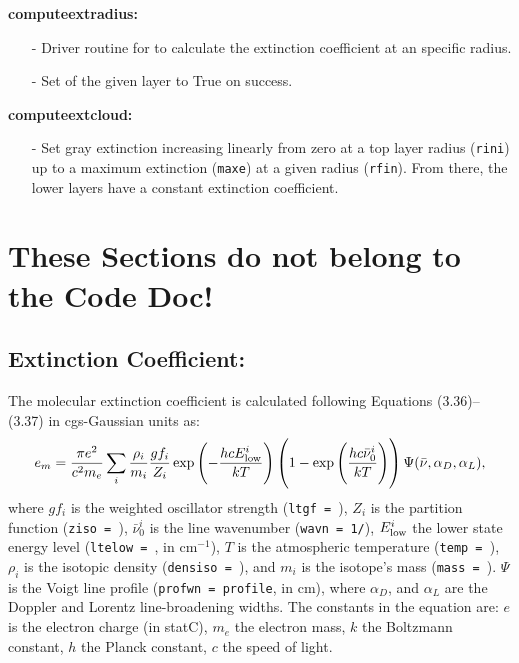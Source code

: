 \documentclass[letterpaper,12pt]{article}
\begin{document}
\textbf{computeextradius:}
\begin{itemize}[leftmargin=10pt, noitemsep, parsep=0pt, topsep=0ex]
\item[-] Driver routine for  to calculate the
  extinction coefficient at an specific radius.
\item[-] Set  of the given layer to True on
  success.
  \newline
\end{itemize}

\textbf{computeextcloud:}
\begin{itemize}[leftmargin=10pt, noitemsep, parsep=0pt, topsep=0ex]
\item[-] Set gray extinction increasing linearly from zero at a top
  layer radius (\texttt{rini}) up to a maximum extinction
  (\texttt{maxe}) at a given radius (\texttt{rfin}). From there, the
  lower layers have a constant extinction coefficient.  \newline
\end{itemize}


\newpage

\section{These Sections do not belong to the Code Doc!}

\subsection{Extinction Coefficient:}
The molecular extinction coefficient is calculated following Equations
(3.36)--(3.37) in cgs-Gaussian units as:
\begin{equation}
\label{eq:extinction}
  e_m = \frac{\pi e^2}{c^2 m_e} \sum_i \frac{\rho_i}{m_i} \frac{gf_i}{Z_i}
      \exp\left(-\frac{hcE_{\rm low}^i}{kT}\right)
      \left(1-\exp\left(\frac{hc\bar\nu_0^i}{kT}\right)\right)
      \Psi(\bar\nu, \alpha_D, \alpha_L),
\end{equation}
where $gf_i$ is the weighted oscillator strength (\texttt{ltgf =
}), $Z_i$ is the partition function
(\texttt{ziso = }), $\bar\nu_0^i$ is the line
wavenumber (\texttt{wavn = 1/}), $E_{\rm low}^i$
the lower state energy level (\texttt{ltelow =
}, in cm$^{-1}$), $T$ is the atmospheric
temperature (\texttt{temp = }), $\rho_i$ is the
isotopic density (\texttt{densiso = }), and
$m_i$ is the isotope's mass (\texttt{mass =
}).  $\Psi$ is the Voigt line profile
(\texttt{profwn = profile}, in cm), where $\alpha_D$, and $\alpha_L$
are the Doppler and Lorentz line-broadening widths.  The constants in
the equation are: $e$ is the electron charge (in statC), $m_e$ the
electron mass, $k$ the Boltzmann constant, $h$ the Planck constant,
$c$ the speed of light.
\end{document}
